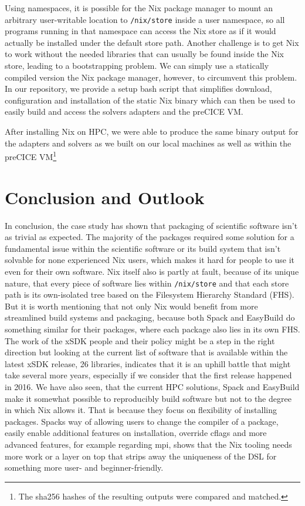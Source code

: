 \documentclass[conference,final,a4paper]{IEEEtran}
\begin{document}
Using namespaces, it is possible for the Nix package manager to mount an arbitrary user-writable location to \texttt{/nix/store} inside a user namespace, so all programs running in that namespace can access the Nix store as if it would actually be installed under the default store path.
Another challenge is to get Nix to work without the needed libraries that can usually be found inside the Nix store, leading to a bootstrapping problem.
We can simply use a statically compiled version the Nix package manager, however, to circumvent this problem.
In our repository, we provide a setup bash script that simplifies download, configuration and installation of the static Nix binary which can then be used to easily build and access the solvers adapters and the preCICE VM.

After installing Nix on HPC, we were able to produce the same binary output for the adapters and solvers as we built on our local machines as well as within the preCICE VM\footnote{The sha256 hashes of the resulting outputs were compared and matched.}

\section{Conclusion and Outlook}

In conclusion, the case study has shown that packaging of scientific software isn't as trivial as expected.
The majority of the packages required some solution for a fundamental issue within the scientific software or its build system that isn't solvable for none experienced Nix users, which makes it hard for people to use it even for their own software.
Nix itself also is partly at fault, because of its unique nature, that every piece of software lies within \texttt{/nix/store} and that each store path is its own-isolated tree based on the Filesystem Hierarchy Standard (FHS).
But it is worth mentioning that not only Nix would benefit from more streamlined build systems and packaging, because both Spack and EasyBuild do something similar for their packages, where each package also lies in its own FHS.
The work of the xSDK people and their policy might be a step in the right direction but looking at the current list of software that is available within the latest xSDK release, 26 libraries, indicates that it is an uphill battle that might take several more years, especially if we consider that the first release happened in 2016.
We have also seen, that the current HPC solutions, Spack and EasyBuild make it somewhat possible to reproducibly build software but not to the degree in which Nix allows it.
That is because they focus on flexibility of installing packages.
Spacks way of allowing users to change the compiler of a package, easily enable additional features on installation, override cflags and more advanced features, for example regarding mpi, shows that the Nix tooling needs more work or a layer on top that strips away the uniqueness of the DSL for something more user- and beginner-friendly.
\end{document}
